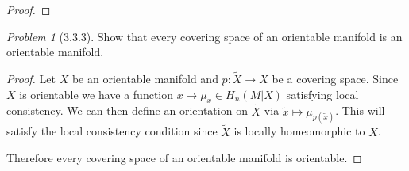 \documentclass[10pt]{article}
\newcommand{\sk}{\vskip 10mm}
\newcommand{\wt}[1]{\widetilde{#1}}
\theoremstyle{remark}
\newtheorem{problem}{Problem}
\begin{document}
\begin{proof}
  
\end{proof}

\sk

\begin{problem}[3.3.3]
  Show that every covering space of an orientable manifold is an orientable
  manifold.
\end{problem} 

\begin{proof}
  Let $X$ be an orientable manifold and $p:\wt{X}\rightarrow X$ be a covering space.
  Since $X$ is orientable we have a function $x\mapsto \mu_x\in H_n(M|X)$ satisfying
  local consistency. We can then define an orientation on $\wt{X}$ via
  $\wt{x}\mapsto \mu_{p(\wt{x})}$. This will satisfy the local consistency condition
  since $\wt{X}$ is locally homeomorphic to $X$.

  Therefore every covering space of an orientable manifold is orientable.
\end{proof}
\end{document}

